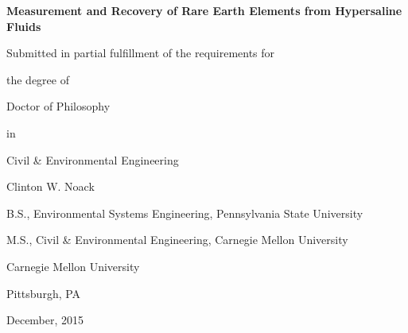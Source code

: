 
\thispagestyle{empty}
\begin{center}

\Huge{\textbf{Measurement and Recovery of Rare Earth Elements from Hypersaline Fluids}}
\vspace{1cm}

\normalsize{
Submitted in partial fulfillment of the requirements for

the degree of

Doctor of Philosophy

in

Civil \& Environmental Engineering
}
\vspace{1cm}

\Large{Clinton W. Noack}
\vspace{1cm}

\normalsize{
B.S., Environmental Systems Engineering, Pennsylvania State University

M.S., Civil \& Environmental Engineering, Carnegie Mellon University
}
\vspace{3cm}

\normalsize{
Carnegie Mellon University

Pittsburgh, PA}

December, 2015


\end{center}

 \clearpage